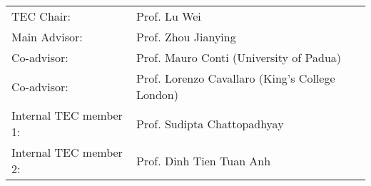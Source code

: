\documentclass[
11pt, %
oneside, %
english, %
singlespacing, %
headsepline, %
]{MastersDoctoralThesis} %
\begin{document}
\begin{tec}
\addchaptertocentry{\tecname}
\begin{tabular}{ll}
	TEC Chair: & Prof. Lu Wei \\
	Main Advisor: & Prof. Zhou Jianying \\
	Co-advisor: & Prof. Mauro Conti (University of Padua) \\
	Co-advisor: & Prof. Lorenzo Cavallaro (King's College London) \\
	Internal TEC member 1: & Prof. Sudipta Chattopadhyay \\
	Internal TEC member 2: & Prof. Dinh Tien Tuan Anh \\
\end{tabular}
\end{tec}
\vfill\eject



%
\end{document}
